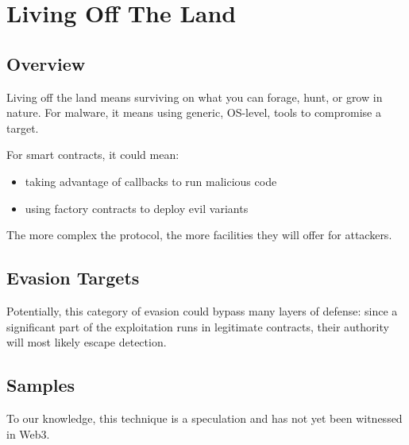 \section{Living Off The Land} \label{sec:living-off-the-land}

\subsection{Overview}

Living off the land means surviving on what you can forage, hunt, or grow in nature.
For malware, it means using generic, OS-level, tools to compromise a target.

For smart contracts, it could mean:

\begin{itemize}
\item{taking advantage of callbacks to run malicious code}
\item{using factory contracts to deploy evil variants}
\end{itemize}

The more complex the protocol, the more facilities they will offer for attackers.

\subsection{Evasion Targets}

Potentially, this category of evasion could bypass many layers of defense:
since a significant part of the exploitation runs in legitimate contracts, their authority will most likely escape detection.

\subsection{Samples}

To our knowledge, this technique is a speculation and has not yet been witnessed in Web3.

